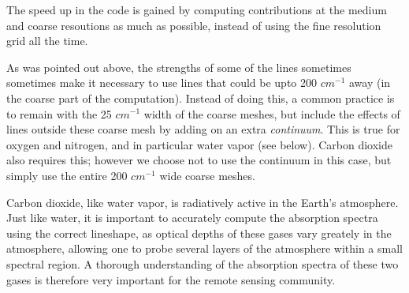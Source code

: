 \documentclass[11pt]{article}
\begin{document}
The speed up in the code is gained by computing contributions at the 
medium and coarse resoutions as much as possible, instead of using the 
fine resolution grid all the time.

As was pointed out above, the strengths of some of the lines sometimes
sometimes make it necessary to use lines that could be upto 200 $cm^{-1}$ 
away (in the coarse part of the computation). Instead of doing this, a 
common practice is to remain with the 25 $cm^{-1}$ width of the coarse 
meshes, but include the effects of lines outside these coarse mesh by adding
on an extra {\it continuum}. This is true for oxygen and nitrogen, and in
particular water vapor (see below). Carbon dioxide also requires this; 
however we choose not to use the continuum in this case, but simply use the
entire 200 $cm^{-1}$ wide coarse meshes.

Carbon dioxide, like water vapor, is radiatively active in the Earth's 
atmosphere. Just like water, it is important to accurately compute the
absorption spectra using the correct lineshape, as optical depths of these
gases vary greately in the atmosphere, allowing one to probe several 
layers of the atmosphere within a small spectral region. A thorough 
understanding of the absorption spectra of these two gases is therefore 
very important for the remote sensing community.
\end{document}
